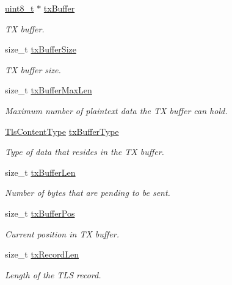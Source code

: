 \begin{DoxyCompactItemize}
\hyperlink{stdint_8h_aba7bc1797add20fe3efdf37ced1182c5}{uint8\+\_\+t} $\ast$ \hyperlink{struct__TlsContext_a0e04e2758829e37fb894b00633c3fe35}{tx\+Buffer}
\begin{DoxyCompactList}\small\item\em TX buffer. \end{DoxyCompactList}\item 
size\+\_\+t \hyperlink{struct__TlsContext_ade33b16266288909a7a350f90778f141}{tx\+Buffer\+Size}
\begin{DoxyCompactList}\small\item\em TX buffer size. \end{DoxyCompactList}\item 
size\+\_\+t \hyperlink{struct__TlsContext_a6353b7de22268d3c37f4d7898e151a54}{tx\+Buffer\+Max\+Len}
\begin{DoxyCompactList}\small\item\em Maximum number of plaintext data the TX buffer can hold. \end{DoxyCompactList}\item 
\hyperlink{tls_8h_a6fad1efb9f011dc3f76039976bef896c}{Tls\+Content\+Type} \hyperlink{struct__TlsContext_ae3c1afa4445a2942466444f01860044e}{tx\+Buffer\+Type}
\begin{DoxyCompactList}\small\item\em Type of data that resides in the TX buffer. \end{DoxyCompactList}\item 
size\+\_\+t \hyperlink{struct__TlsContext_aafc38bc91b63426ce3756839aeebfea1}{tx\+Buffer\+Len}
\begin{DoxyCompactList}\small\item\em Number of bytes that are pending to be sent. \end{DoxyCompactList}\item 
size\+\_\+t \hyperlink{struct__TlsContext_a8db8af31a881f00e98feb5f454dd0706}{tx\+Buffer\+Pos}
\begin{DoxyCompactList}\small\item\em Current position in TX buffer. \end{DoxyCompactList}\item 
size\+\_\+t \hyperlink{struct__TlsContext_a70252aa415a0deabcbf4826949e78201}{tx\+Record\+Len}
\begin{DoxyCompactList}\small\item\em Length of the T\+LS record. \end{DoxyCompactList}\item 

\end{DoxyCompactItemize}
